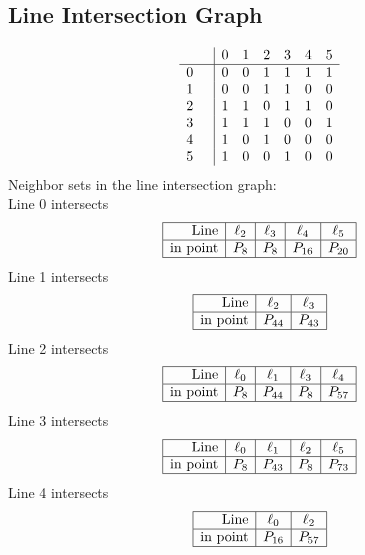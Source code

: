 \documentclass{article}
\begin{document}
{\subsection*{Line Intersection Graph}
{\arraycolsep=1pt
$$
\begin{array}{rr|*{6}r}
 &  & 0 & 1 & 2 & 3 & 4 & 5\\
\hline
0 &  & 0 & 0 & 1 & 1 & 1 & 1\\
1 &  & 0 & 0 & 1 & 1 & 0 & 0\\
2 &  & 1 & 1 & 0 & 1 & 1 & 0\\
3 &  & 1 & 1 & 1 & 0 & 0 & 1\\
4 &  & 1 & 0 & 1 & 0 & 0 & 0\\
5 &  & 1 & 0 & 0 & 1 & 0 & 0\\
\end{array}
$$
}%
Neighbor sets in the line intersection graph:\\
Line 0 intersects 
$$
\begin{array}{|r*{4}{|c}|}
\hline
\mbox{Line}  & \ell_{2} & \ell_{3} & \ell_{4} & \ell_{5}\\
\hline
\mbox{in point}  & P_{8} & P_{8} & P_{16} & P_{20}\\
\hline
\end{array}
$$
Line 1 intersects 
$$
\begin{array}{|r*{2}{|c}|}
\hline
\mbox{Line}  & \ell_{2} & \ell_{3}\\
\hline
\mbox{in point}  & P_{44} & P_{43}\\
\hline
\end{array}
$$
Line 2 intersects 
$$
\begin{array}{|r*{4}{|c}|}
\hline
\mbox{Line}  & \ell_{0} & \ell_{1} & \ell_{3} & \ell_{4}\\
\hline
\mbox{in point}  & P_{8} & P_{44} & P_{8} & P_{57}\\
\hline
\end{array}
$$
Line 3 intersects 
$$
\begin{array}{|r*{4}{|c}|}
\hline
\mbox{Line}  & \ell_{0} & \ell_{1} & \ell_{2} & \ell_{5}\\
\hline
\mbox{in point}  & P_{8} & P_{43} & P_{8} & P_{73}\\
\hline
\end{array}
$$
Line 4 intersects 
$$
\begin{array}{|r*{2}{|c}|}
\hline
\mbox{Line}  & \ell_{0} & \ell_{2}\\
\hline
\mbox{in point}  & P_{16} & P_{57}\\
\hline
\end{array}
$$}
\end{document}
